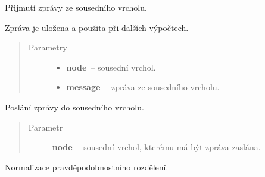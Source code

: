 \begin{fulllineitems}

\begin{fulllineitems}
\label{alex.infer:alex.infer.factor.alex.infer.node.DiscreteVariableNode.message_from}
Přijmutí zprávy ze sousedního vrcholu.

Zpráva je uložena a použita při dalších výpočtech.
\begin{quote}\begin{description}
\item[{Parametry}] \leavevmode\begin{itemize}
\item {} 
\textbf{node}~-- sousední vrchol.

\item {} 
\textbf{message}~-- zpráva ze sousedního vrcholu.

\end{itemize}

\end{description}\end{quote}

\end{fulllineitems}


\begin{fulllineitems}
\label{alex.infer:alex.infer.factor.alex.infer.node.DiscreteVariableNode.message_to}
Poslání zprávy do sousedního vrcholu.
\begin{quote}\begin{description}
\item[{Parametr}] \leavevmode
\textbf{node}~-- sousední vrchol, kterému má být zpráva zaslána.

\end{description}\end{quote}

\end{fulllineitems}


\begin{fulllineitems}
\label{alex.infer:alex.infer.factor.alex.infer.node.DiscreteVariableNode.normalize}
Normalizace pravděpodobnostního rozdělení.


\end{fulllineitems}
\end{fulllineitems}
